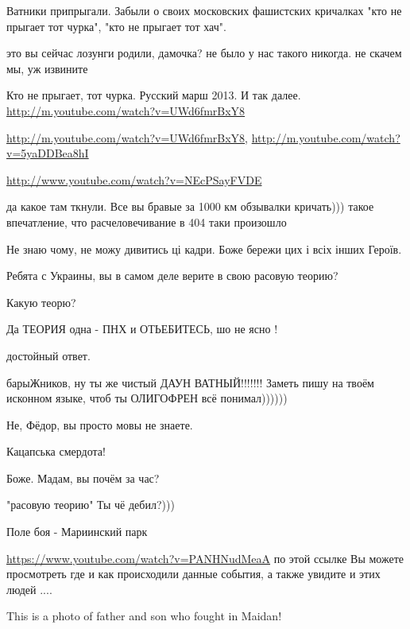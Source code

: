 
Ватники припрыгали. Забыли о своих московских фашистских кричалках "кто не
прыгает тот чурка", "кто не прыгает тот хач".

\begin{itemize} %
это вы сейчас лозунги родили, дамочка? не было у нас такого никогда. не скачем мы, уж извините

Кто не прыгает, тот чурка. Русский марш 2013. И так далее. \url{http://m.youtube.com/watch?v=UWd6fmrBxY8}

\url{http://m.youtube.com/watch?v=UWd6fmrBxY8}, \url{http://m.youtube.com/watch?v=5yaDDBea8hI}

\url{http://www.youtube.com/watch?v=NEcPSayFVDE}

да какое там ткнули. Все вы бравые за 1000 км обзывалки кричать))) такое
впечатление, что расчеловечивание в 404 таки произошло

\end{itemize} %

Не знаю чому, не можу дивитись ці кадри. Боже бережи цих і всіх інших Героїв.

Ребята с Украины, вы в самом деле верите в свою расовую теорию?

\begin{itemize} %
Какую теорю?

Да ТЕОРИЯ одна - ПНХ и ОТЬЕБИТЕСЬ, шо не ясно !

достойный ответ.

барыЖников, ну ты же чистый ДАУН ВАТНЫЙ!!!!!!! Заметь пишу на твоём исконном языке, чтоб ты ОЛИГОФРЕН всё понимал))))))

Не, Фёдор, вы просто мовы не знаете.

Кацапська смердота!

Боже. Мадам, вы почём за час?

"расовую теорию" Ты чё дебил?)))
\end{itemize} %

Поле боя - Мариинский парк

\url{https://www.youtube.com/watch?v=PANHNudMeaA} по этой ссылке Вы можете просмотреть где и как происходили данные события, а также увидите и этих людей ....

This is a photo of father and son who fought in Maidan!



